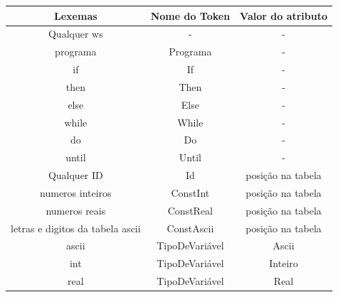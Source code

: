 \documentclass[11pt]{article}
\begin{document}
\begin{table}[H]
    \hspace{-0.7cm}
    \begin{tabular}{c|c|c}
        \hline
        \textbf{Lexemas}   & \textbf{Nome do Token}   & \textbf{Valor do atributo}  \\
        \hline
         Qualquer ws        &        -                 &            -                \\
        \hline
         programa           &        Programa          &            -                \\
        \hline
         if                &        If                &            -                \\
        \hline
         then              &        Then              &            -                \\
        \hline
         else              &        Else              &            -                \\
        \hline
         while             &        While             &            -                \\
        \hline
         do                &        Do                &            -                \\
        \hline
         until             &        Until             &            -                \\
        \hline
        \hline
         Qualquer ID                          &      Id                   &           posição na tabela \\
        \hline
         numeros inteiros                     &      ConstInt             &          posição na tabela  \\
        \hline
         numeros reais                        &      ConstReal            &          posição na tabela  \\
        \hline
         letras e digitos da tabela ascii     &      ConstAscii           &         posição na tabela   \\
        \hline
        \hline
         ascii             &      TipoDeVariável      &           Ascii                      \\
        \hline
         int               &      TipoDeVariável      &           Inteiro                    \\
        \hline
         real              &      TipoDeVariável      &           Real                       \\
        \hline

\end{tabular}
\end{table}
\end{document}
